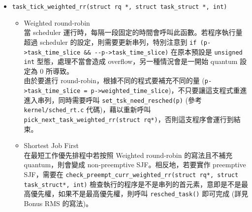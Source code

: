 \documentclass{res}
\begin{document}
\begin{resume}
\begin{itemize}
	\item
	\lstinline{task_tick_weighted_rr(struct rq *, struct task_struct *, int)} \\
	\begin{itemize}
		\item Weighted round-robin \\
		當 scheduler 運行時，每隔一段固定的時間會呼叫此函數。若程序執行量超過 scheduler 的設定，則需要更新串列，特別注意到 \lstinline{if (p->task_time_slice && --p->task_time_slice)} 在原本預設是 \lstinline{unsigned int} 型態，處理不當會造成 overflow，另一種情況會是一開始 quantum 設定為 0 所導致。 \\
		由於要進行 round-robin，根據不同的程式要補充不同的量 (\lstinline{p->task_time_slice = p->weighted_time_slice})，不只要讓這支程式重進進入串列，同時需要呼叫 \lstinline{set_tsk_need_resched(p)} (參考 \lstinline{kernel/sched_rt.c} 代碼)，藉以重新呼叫 \lstinline{pick_next_task_weighted_rr(struct rq*)}，否則這支程序會運行到結束。
		\item Shortest Job First \\
		在最短工作優先排程中若按照 Weighted round-robin 的寫法且不補充 quantum，則會變成 non-preemptive SJF。相反地，若要實作 preemptive SJF，需要在 \lstinline{check_preempt_curr_weighted_rr(struct rq*, struct task_struct*, int)} 檢查執行的程序是不是串列的首元素，意即是不是最高優先權，如果不是最高優先權，則呼叫 \lstinline{resched_task()} 即可完成 (詳見 Bonus RMS 的寫法)。
	\end{itemize}
\end{itemize}

\vspace*{.1in} 


\end{resume}
\end{document}
